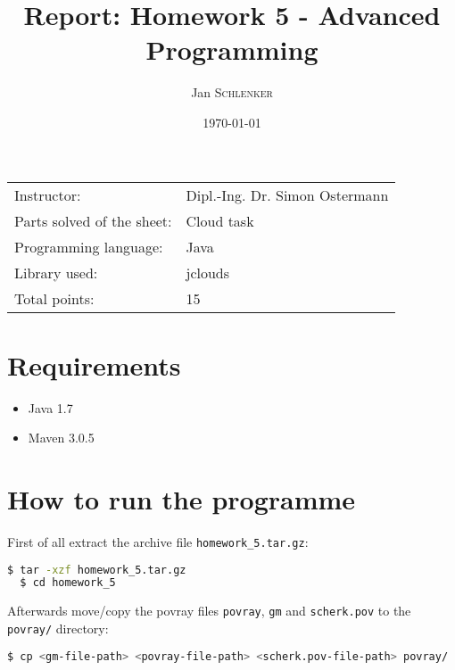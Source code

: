 \documentclass{article}
\title{Report: Homework 5 - Advanced Programming}%
\author{Jan \textsc{Schlenker}} %
\date{\today} %
\begin{document}
\maketitle %

\begin{center}
\begin{tabular}{l l}
Instructor: & Dipl.-Ing. Dr. Simon Ostermann \\
Parts solved of the sheet: & Cloud task \\
Programming language: & Java \\
Library used: & jclouds \\
Total points: & 15 \\
\end{tabular}
\end{center}


\section{Requirements}

\begin{itemize}
\item Java 1.7
\item Maven 3.0.5
\end{itemize}

\section{How to run the programme}

First of all extract the archive file \texttt{homework\_5.tar.gz}:

\begin{lstlisting}[language=bash, deletekeywords={cd}]
  $ tar -xzf homework_5.tar.gz
  $ cd homework_5
\end{lstlisting}

Afterwards move/copy the povray files \texttt{povray}, \texttt{gm} and \texttt{scherk.pov} to the \texttt{povray/} directory:

\begin{lstlisting}[language=bash]
  $ cp <gm-file-path> <povray-file-path> <scherk.pov-file-path> povray/
\end{lstlisting}
\end{document}
